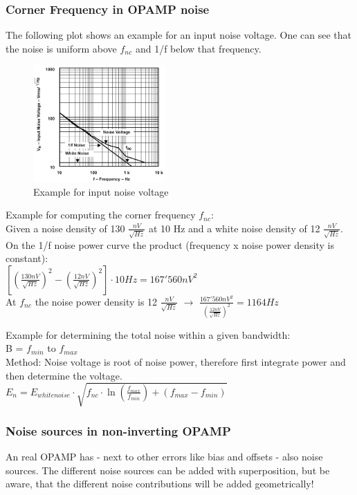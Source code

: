 		\subsubsection{Corner Frequency in OPAMP noise}
			The following plot shows an example for an input noise voltage. One can see that the noise is uniform above $f_{nc}$ and 1/f below that frequency. 
			
			\begin{figure}[h]
				\centering
				\includegraphics[width=0.45\textwidth]{images/NoiseExample.png}
				\caption{Example for input noise voltage}
				\label{Fig:NoiseExample}
			\end{figure}
			Example for computing the corner frequency $f_{nc}$:\\
			Given a noise density of 130 $\frac{nV}{\sqrt{Hz}}$ at 10 Hz and a white noise density of 12 $\frac{nV}{\sqrt{Hz}}$. \\
			On the 1/f noise power curve the product (frequency x noise power density is constant):\\
			$\left[\left(\frac{130 nV}{\sqrt{Hz}}\right)^2 - \left(\frac{12 nV}{\sqrt{Hz}}\right)^2\right]\cdot 10Hz = 167'560 nV^2$\\
			At $f_{nc}$ the noise power density is 12 $\frac{nV}{\sqrt{Hz}}$ $\rightarrow$ $\frac{167'560 nV^2}{\left(\frac{12nV}{\sqrt{Hz}}\right)^2} = 1164 Hz$
	
			Example for determining the total noise within a given bandwidth:\\
			B = $f_{min}$ to $f_{max}$\\
			Method: Noise voltage is root of noise power, therefore first integrate power and then determine the voltage. \\
			$E_n = E_{whitenoise} \cdot \sqrt{f_{nc}\cdot \ln\left(\frac{f_{max}}{f_{min}}\right) + \left(f_{max}-f_{min}\right)}$\\
		\subsubsection{Noise sources in non-inverting OPAMP}	
			An real OPAMP has - next to other errors like bias and offsets - also noise sources. The different noise sources can be added with superposition, but be aware, that the different noise contributions will be added geometrically!\\
			

